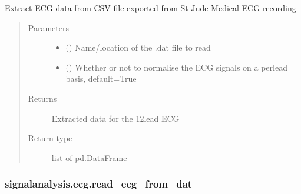 \documentclass[letterpaper,10pt,english]{sphinxmanual}
\begin{document}
\begin{fulllineitems}
\label{\detokenize{_autosummary/signalanalysis.ecg.read_ecg_from_csv:signalanalysis.ecg.read_ecg_from_csv}}
\sphinxAtStartPar
Extract ECG data from CSV file exported from St Jude Medical ECG recording
\begin{quote}\begin{description}
\item[{Parameters}] \leavevmode\begin{itemize}
\item {} 
\sphinxAtStartPar
{} () \textendash{} Name/location of the .dat file to read

\item {} 
\sphinxAtStartPar
{} (\sphinxstyleliteralemphasis{\sphinxupquote{, }}) \textendash{} Whether or not to normalise the ECG signals on a per\sphinxhyphen{}lead basis, default=True

\end{itemize}

\item[{Returns}] \leavevmode
\sphinxAtStartPar
{} \textendash{} Extracted data for the 12\sphinxhyphen{}lead ECG

\item[{Return type}] \leavevmode
\sphinxAtStartPar
list of pd.DataFrame

\end{description}\end{quote}

\end{fulllineitems}



\subsubsection{signalanalysis.ecg.read\_ecg\_from\_dat}
\label{\detokenize{_autosummary/signalanalysis.ecg.read_ecg_from_dat:signalanalysis-ecg-read-ecg-from-dat}}\label{\detokenize{_autosummary/signalanalysis.ecg.read_ecg_from_dat::doc}}
\end{document}
